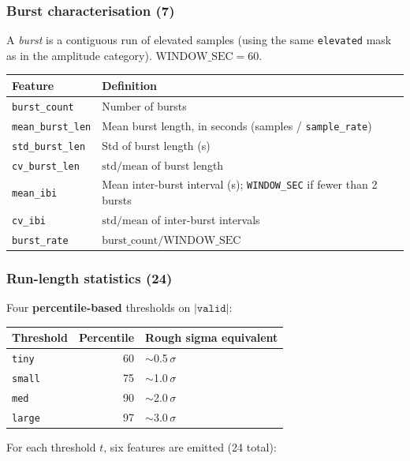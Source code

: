 \documentclass[11pt,a4paper]{article}
\begin{document}
\subsubsection*{Burst characterisation (7)}

A \emph{burst} is a contiguous run of elevated samples (using the same
\texttt{elevated} mask as in the amplitude category).
$\mathrm{WINDOW\_SEC} = 60$.

\begin{tabular}{@{}lp{10cm}@{}}
\toprule
\textbf{Feature} & \textbf{Definition} \\
\midrule
\texttt{burst\_count}    & Number of bursts \\
\texttt{mean\_burst\_len}& Mean burst length, in seconds (samples / \texttt{sample\_rate}) \\
\texttt{std\_burst\_len} & Std of burst length (s) \\
\texttt{cv\_burst\_len}  & $\mathrm{std} / \mathrm{mean}$ of burst length \\
\texttt{mean\_ibi}       & Mean inter-burst interval (s); \texttt{WINDOW\_SEC} if fewer than 2 bursts \\
\texttt{cv\_ibi}         & $\mathrm{std} / \mathrm{mean}$ of inter-burst intervals \\
\texttt{burst\_rate}     & $\mathrm{burst\_count} / \mathrm{WINDOW\_SEC}$ \\
\bottomrule
\end{tabular}

\subsubsection*{Run-length statistics (24)}

Four \textbf{percentile-based} thresholds on $|\texttt{valid}|$:

\begin{tabular}{@{}lrl@{}}
\toprule
\textbf{Threshold} & \textbf{Percentile} & \textbf{Rough sigma equivalent} \\
\midrule
\texttt{tiny}  & 60 & $\sim$0.5\,$\sigma$ \\
\texttt{small} & 75 & $\sim$1.0\,$\sigma$ \\
\texttt{med}   & 90 & $\sim$2.0\,$\sigma$ \\
\texttt{large} & 97 & $\sim$3.0\,$\sigma$ \\
\bottomrule
\end{tabular}

For each threshold $t$, six features are emitted (24 total):
\end{document}
